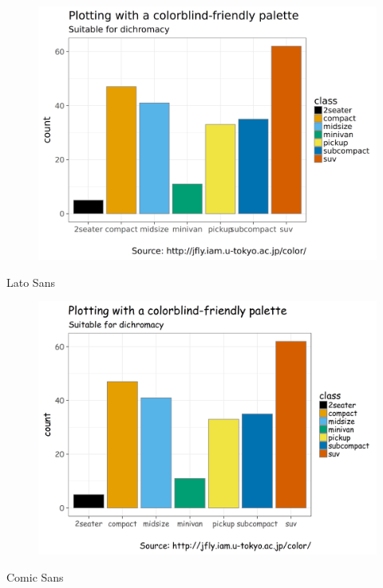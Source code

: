 
\begin{frame}
  \begin{figure}[htp!]
    \centering
    \includegraphics[width=0.9\linewidth]{figures/barchart-latosans.png}
  \end{figure}

  \small Lato Sans 
  
\end{frame}


\begin{frame}
  \begin{figure}[htp!]
    \centering
    \includegraphics[width=0.9\linewidth]{figures/barchart-comicsansms.png}
  \end{figure}

  \small Comic Sans
\end{frame}


